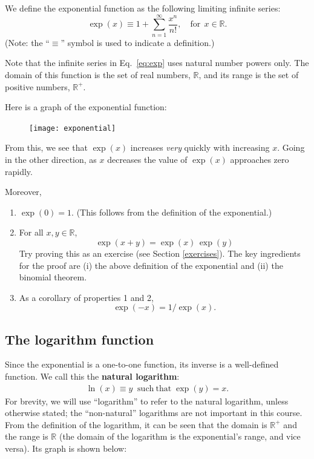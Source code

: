 \documentclass[10pt,a4paper]{article}
\begin{document}
We define the exponential function as the following limiting infinite series:
\begin{equation}
  \exp(x) \equiv 1 + \sum_{n=1}^\infty\frac{x^n}{n!}, \quad\mathrm{for}\;\, x \in \mathbb{R}.
  \label{eq:exp}
\end{equation}
(Note: the ``$\equiv$'' symbol is used to indicate a definition.)

Note that the infinite series in Eq.~\eqref{eq:exp} uses natural
number powers only.  The domain of this function is the set of real
numbers, $\mathbb{R}$, and its range is the set of positive numbers,
$\mathbb{R}^+$.

\clearpage
Here is a graph of the exponential function:

\begin{figure}[ht]
  \centering\texttt{[image: exponential]}
\end{figure}

\label{exponential-properties}

From this, we see that $\exp(x)$ increases \textit{very} quickly with
increasing $x$.  Going in the other direction, as $x$ decreases the
value of $\exp(x)$ approaches zero rapidly.

Moreover,
\begin{enumerate}
\item $\exp(0) = 1$. (This follows from the definition of the exponential.)

\item For all $x, y \in \mathbb{R}$,
  \begin{equation}
    \exp(x+y) = \exp(x)\,\exp(y)
    \label{eq:exponential_add}
  \end{equation}
  Try proving this as an exercise (see Section \ref{exercises}). The
  key ingredients for the proof are (i) the above definition of the
  exponential and (ii) the binomial theorem.

\item As a corollary of properties 1 and 2,
  \begin{equation}
    \exp(-x) = 1/\exp(x).
  \end{equation}
\end{enumerate}

\subsection{The logarithm function}
\label{the-logarithm-function}

Since the exponential is a one-to-one function, its inverse is a
well-defined function.  We call this the \textbf{natural logarithm}:
\begin{align}
  \ln(x) \equiv y \;\; \mathrm{such}~\mathrm{that}\; \exp(y) = x.
\end{align}
For brevity, we will use ``logarithm'' to refer to the natural
logarithm, unless otherwise stated; the ``non-natural'' logarithms are
not important in this course. From the definition of the logarithm, it
can be seen that the domain is $\mathbb{R}^+$ and the range is
$\mathbb{R}$ (the domain of the logarithm is the exponential's range,
and vice versa).  Its graph is shown below:
\end{document}
